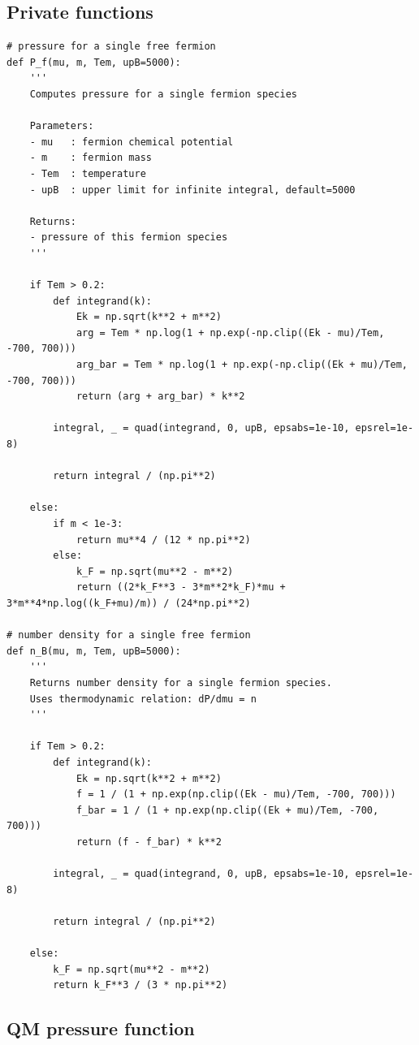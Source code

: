 \documentclass[12pt]{article}
\begin{document}
\subsection{Private functions}

\begin{lstlisting}[style=mypython]
# pressure for a single free fermion
def P_f(mu, m, Tem, upB=5000):
    '''
    Computes pressure for a single fermion species

    Parameters:
    - mu   : fermion chemical potential
    - m    : fermion mass
    - Tem  : temperature
    - upB  : upper limit for infinite integral, default=5000

    Returns:
    - pressure of this fermion species
    '''

    if Tem > 0.2:
        def integrand(k):
            Ek = np.sqrt(k**2 + m**2)
            arg = Tem * np.log(1 + np.exp(-np.clip((Ek - mu)/Tem, -700, 700)))
            arg_bar = Tem * np.log(1 + np.exp(-np.clip((Ek + mu)/Tem, -700, 700)))
            return (arg + arg_bar) * k**2

        integral, _ = quad(integrand, 0, upB, epsabs=1e-10, epsrel=1e-8)

        return integral / (np.pi**2)

    else:
        if m < 1e-3:
            return mu**4 / (12 * np.pi**2)
        else:
            k_F = np.sqrt(mu**2 - m**2)
            return ((2*k_F**3 - 3*m**2*k_F)*mu + 3*m**4*np.log((k_F+mu)/m)) / (24*np.pi**2)

# number density for a single free fermion
def n_B(mu, m, Tem, upB=5000):
    '''
    Returns number density for a single fermion species.
    Uses thermodynamic relation: dP/dmu = n
    '''

    if Tem > 0.2:
        def integrand(k):
            Ek = np.sqrt(k**2 + m**2)
            f = 1 / (1 + np.exp(np.clip((Ek - mu)/Tem, -700, 700)))
            f_bar = 1 / (1 + np.exp(np.clip((Ek + mu)/Tem, -700, 700)))
            return (f - f_bar) * k**2

        integral, _ = quad(integrand, 0, upB, epsabs=1e-10, epsrel=1e-8)

        return integral / (np.pi**2)

    else:
        k_F = np.sqrt(mu**2 - m**2)
        return k_F**3 / (3 * np.pi**2)
\end{lstlisting}

\subsection{QM pressure function}\label{QM-EoS}
\end{document}

